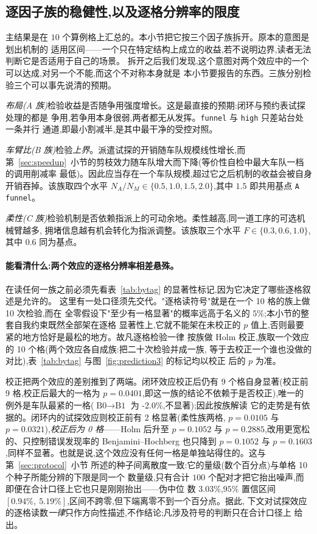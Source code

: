 \documentclass[manuscript,screen,review]{acmart}
\newcommand{\NCases}{10}
\newcommand{\NSeeds}{10}
\newcommand{\NPairs}{100}
\newcommand{\HLProbeLoop}{3.03\%}
\newcommand{\CIProbeLoop}{$[0.94\%,\ 5.19\%]$}
\newcommand{\CellsSigLoop}{9}
\newcommand{\CellsSigLoopAdj}{9}
\newcommand{\CellsSigProbe}{2}
\newcommand{\CellsSigProbeAdj}{0}
\newcommand{\GainLoopStarve}{-2.0\%}     %
\newcommand{\PProbeFlexLoRaw}{=0.0105}
\newcommand{\PProbeFlexLoHolm}{=0.1052}
\newcommand{\PProbeFlexLoBH}{=0.1052}
\newcommand{\PProbeFlexHiRaw}{=0.0321}
\newcommand{\PProbeFlexHiHolm}{=0.2885}
\newcommand{\PProbeFlexHiBH}{=0.1603}
\newcommand{\PLoopCellMax}{=0.0401}
\begin{document}
\subsection{逐因子族的稳健性,以及逐格分辨率的限度}
\label{sec:whichcongestion}

主结果是在 $\NCases$ 个算例格上汇总的。本小节把它按三个因子族拆开。原本的意图是划出机制的
适用区间——一个只在特定结构上成立的收益,若不说明边界,读者无法判断它是否适用于自己的场景。
拆开之后我们发现,这个意图对两个效应中的一个可以达成,对另一个不能,而这个不对称本身就是
本小节要报告的东西。三族分别检验三个可以事先说清的预期。

\emph{布局(A 族)}检验收益是否随争用强度增长。这是最直接的预期:闭环与预约表试探处理的都是
争用,若争用本身很弱,两者都无从发挥。\texttt{funnel} 与 \texttt{high} 只差站台处一条并行
通道,即最小割减半,是其中最干净的受控对照。

\emph{车臂比(B 族)}检验\emph{上界}。派遣试探的开销随车队规模线性增长,而
第~\ref{sec:speedup}~小节的剪枝效力随车队增大而下降(等价性自检中最大车队一档的调用削减率
最低)。因此应当存在一个车队规模,超过它之后机制的收益会被自身开销吞掉。该族取四个水平
$N_A/N_M\in\{0.5,1.0,1.5,2.0\}$,其中 $1.5$ 即共用基点 \texttt{A funnel}。

\emph{柔性(C 族)}检验机制是否依赖指派上的可动余地。柔性越高,同一道工序的可选机械臂越多,
拥堵信息越有机会转化为指派调整。该族取三个水平 $F\in\{0.3,0.6,1.0\}$,其中 $0.6$ 同为基点。

\paragraph{能看清什么:两个效应的逐格分辨率相差悬殊。}
在读任何一族之前必须先看表~\ref{tab:bytag} 的显著性标记,因为它决定了哪些逐格叙述是允许的。
这里有一处口径须先交代。"逐格读符号"就是在一个 \NCases{} 格的族上做 \NCases{} 次检验,而在
全零假设下"至少有一格显著"的概率远高于名义的 $5\%$;本小节的整套自我约束既然全部架在逐格
显著性上,它就不能架在未校正的 $p$ 值上,否则最要紧的地方恰好是最松的地方。故凡逐格检验一律
按族做 Holm 校正,族取一个效应的 \NCases{} 个格(两个效应各自成族:把二十次检验并成一族,
等于去校正一个谁也没做的对比),表~\ref{tab:bytag} 与图~\ref{fig:prediction3} 的标记均以校正
后的 $p$ 为准。

校正把两个效应的差别推到了两端。闭环效应校正后仍有 \CellsSigLoopAdj{} 个格自身显著(校正前
\CellsSigLoop{} 格,校正后最大的一格为 $p\PLoopCellMax$,即这一族的结论不依赖于是否校正),唯一的
例外是车队最紧的一格($\text{B0}\to\text{B1}$ 为 \GainLoopStarve{},不显著);因此按族解读
它的走势是有依据的。闭环内的试探效应则校正前有 \CellsSigProbe{} 格显著(柔性族两格,
$p\PProbeFlexLoRaw$ 与 $p\PProbeFlexHiRaw$),\emph{校正后为 \CellsSigProbeAdj{} 格}——Holm 后升至
$p\PProbeFlexLoHolm$ 与 $p\PProbeFlexHiHolm$,改用更宽松的、只控制错误发现率的
Benjamini--Hochberg 也只降到 $p\PProbeFlexLoBH$ 与 $p\PProbeFlexHiBH$,同样不显著。也就是说,这个效应没有任何一格是单独站得住的。这与第~\ref{sec:protocol}~小节
所述的种子间离散度一致:它的量级(数个百分点)与单格 \NSeeds{} 个种子所能分辨的下限是同一个
数量级,只有合计 $\NPairs$ 个配对才把它抬出噪声,而即便在合计口径上它也只是刚刚抬出——伪中位
数 \HLProbeLoop{},$95\%$ 置信区间 \CIProbeLoop{},区间不跨零,但下端离零不到一个百分点。据此,
下文对试探效应的逐格读数\emph{一律}只作方向性描述,不作结论;凡涉及符号的判断只在合计口径上
给出。
\end{document}
